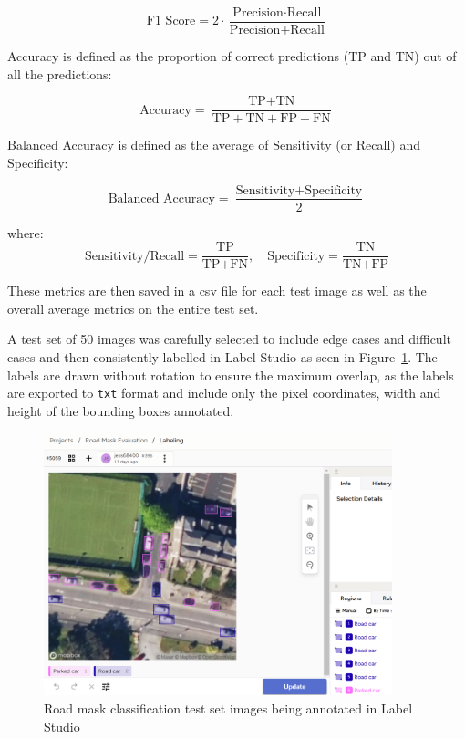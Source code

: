 \[
  \text{F1 Score} = 2 \cdot \frac{\text{Precision} \cdot \text{Recall}}{\text{Precision} + \text{Recall}}
\]

Accuracy is defined as the proportion of correct predictions (TP and TN) out of
all the predictions:

\[
  \text{Accuracy} = \frac{\text{TP} + \text{TN}}{\text{TP} + \text{TN} + \text{FP} + \text{FN}}
\]

Balanced Accuracy is defined as the average of Sensitivity (or Recall) and
Specificity:

\[
  \text{Balanced Accuracy} = \frac{\text{Sensitivity} + \text{Specificity}}{2}
\]

where:
\[
  \text{Sensitivity/Recall} = \frac{\text{TP}}{\text{TP} + \text{FN}}, \quad
  \text{Specificity} = \frac{\text{TN}}{\text{TN} + \text{FP}}
\]

These metrics are then saved in a csv file for each test image as well as the
overall average metrics on the entire test set.

A test set of 50 images was carefully selected to include edge cases and
difficult cases and then consistently labelled in Label Studio as seen in
Figure~\ref{fig:LabelStudio_test_set}. The labels are drawn without rotation to
ensure the maximum overlap, as the labels are exported to \texttt{txt} format
and include only the pixel coordinates, width and  height of the bounding boxes
annotated.

\begin{figure}[htbp]
  \centering
  \includegraphics[width=0.9\textwidth]{images/label_studio4.png}
  \caption{Road mask classification test set images being annotated in Label Studio}
  \label{fig:LabelStudio_test_set}
\end{figure}

